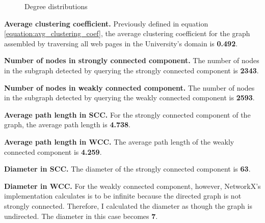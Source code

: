 \begin{figure}
    \centering
    \qquad
    \caption{Degree distributions}
    \label{fig:6}
\end{figure}

\textbf{Average clustering coefficient.} Previously defined in equation \ref{equation:avg_clustering_coef}, the average clustering coefficient for the graph assembled by traversing all web pages in the University's domain is \textbf{0.492}.

\textbf{Number of nodes in strongly connected component.} The number of nodes in the subgraph detected by querying the strongly connected component is \textbf{2343}.

\textbf{Number of nodes in weakly connected component.} The number of nodes in the subgraph detected by querying the weakly connected component is \textbf{2593}.

\textbf{Average path length in SCC.} For the strongly connected component of the graph, the average path length is \textbf{4.738}.

\textbf{Average path length in WCC.} The average path length of the weakly connected component is \textbf{4.259}.

\textbf{Diameter in SCC.} The diameter of the strongly connected component is \textbf{63}.

\textbf{Diameter in WCC.} For the weakly connected component, however, NetworkX's implementation calculates is to be infinite because the directed graph is not strongly connected. Therefore, I calculated the diameter as though the graph is undirected. The diameter in this case becomes \textbf{7}.

